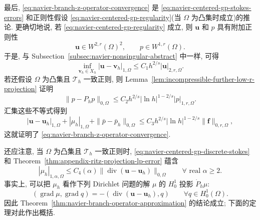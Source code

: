 最后, \eqref{eq:navier-branch-z-operator-convergence} 是
\eqref{eq:navier-centered-gp-stokes-errors} 和正则性假设
\eqref{eq:navier-centered-gp-regularity}(当 $\Omega$ 为凸集时成立)的推论.
更确切地说, 若 \eqref{eq:navier-centered-gp-regularity} 成立, 则
$\boldsymbol u$ 和 $p$ 具有附加正则性
\[
\boldsymbol u\in W^{2,r}(\Omega)^2,
\qquad p\in W^{1,r}(\Omega).
\]
于是, 与 Subsection~\ref{subsec:navier-nonsingular-abstract} 中一样, 可得
\begin{equation}\label{eq:navier-centered-gp-velocity-approximation}
\inf_{\boldsymbol v_h\in X_h}
|\boldsymbol u-\boldsymbol v_h|_{1,\Omega}
\leq C_1h^{2/s}|\boldsymbol u|_{2,r,\Omega}.
\end{equation}
若还假设 $\Omega$ 为凸集且 $\mathcal T_h$ 一致正则, 则
Lemma~\ref{lem:incompressible-further-low-r-projection} 证明
\begin{equation}\label{eq:navier-centered-gp-pressure-projection}
\|p-P_hp\|_{0,\Omega}
\leq C_2h^{2/s}|\ln h|^{1-2/s}|p|_{1,r,\Omega}.
\end{equation}
汇集这些不等式得到
\begin{equation}\label{eq:navier-centered-gp-operator-error}
|\boldsymbol u-\boldsymbol u_h|_{1,\Omega}
+|\mu_h|_{1,\Omega}
+\|\bar p-\bar p_h\|_{0,\Omega}
\leq C_3h^{2/s}|\ln h|^{1-2/s}
\|\boldsymbol f\|_{0,r,\Omega},
\end{equation}
这就证明了 \eqref{eq:navier-branch-z-operator-convergence}.

还应注意, 当 $\Omega$ 为凸集且 $\mathcal T_h$ 一致正则时,
\eqref{eq:navier-centered-gp-discrete-stokes} 和
Theorem~\ref{thm:appendix-ritz-projection-lp-error} 蕴含
\begin{equation}\label{eq:navier-centered-gp-potential-lp}
|\mu_h|_{1,\alpha,\Omega}
\leq C_4(\alpha)
\|\operatorname{div}(\boldsymbol u-\boldsymbol u_h)\|_{0,\Omega}
\qquad\forall\text{ real }\alpha\geq2.
\end{equation}
事实上, 可以把 $\mu_h$ 看作下列 Dirichlet 问题的解 $\mu$ 的
$H_0^1$ 投影 $\dot P_h\mu$:
\[
(\operatorname{grad}\mu,\operatorname{grad}q)
=-(\operatorname{div}(\boldsymbol u-\boldsymbol u_h),q)
\qquad\forall q\in H_0^1(\Omega).
\]
因此 Theorem~\ref{thm:navier-branch-operator-approximation} 的结论成立;
下面的定理对此作出概括.

